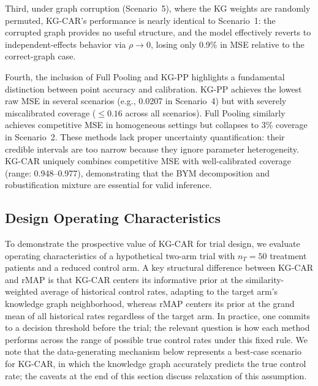 \documentclass[12pt]{article}
\begin{document}
Third, under graph corruption (Scenario~5), where the KG weights are randomly permuted, KG-CAR's performance is nearly identical to Scenario~1: the corrupted graph provides no useful structure, and the model effectively reverts to independent-effects behavior via $\rho \to 0$, losing only 0.9\% in MSE relative to the correct-graph case.

Fourth, the inclusion of Full Pooling and KG-PP highlights a fundamental distinction between point accuracy and calibration. KG-PP achieves the lowest raw MSE in several scenarios (e.g., 0.0207 in Scenario~4) but with severely miscalibrated coverage ($\leq 0.16$ across all scenarios). Full Pooling similarly achieves competitive MSE in homogeneous settings but collapses to 3\% coverage in Scenario~2. These methods lack proper uncertainty quantification: their credible intervals are too narrow because they ignore parameter heterogeneity. KG-CAR uniquely combines competitive MSE with well-calibrated coverage (range: 0.948--0.977), demonstrating that the BYM decomposition and robustification mixture are essential for valid inference.

\subsection{Design Operating Characteristics}
\label{sec:design_oc}

To demonstrate the prospective value of KG-CAR for trial design, we evaluate operating characteristics of a hypothetical two-arm trial with $n_T = 50$ treatment patients and a reduced control arm. A key structural difference between KG-CAR and rMAP is that KG-CAR centers its informative prior at the similarity-weighted average of historical control rates, adapting to the target arm's knowledge graph neighborhood, whereas rMAP centers its prior at the grand mean of all historical rates regardless of the target arm. In practice, one commits to a decision threshold before the trial; the relevant question is how each method performs across the range of possible true control rates under this fixed rule. We note that the data-generating mechanism below represents a best-case scenario for KG-CAR, in which the knowledge graph accurately predicts the true control rate; the caveats at the end of this section discuss relaxation of this assumption.
\end{document}
